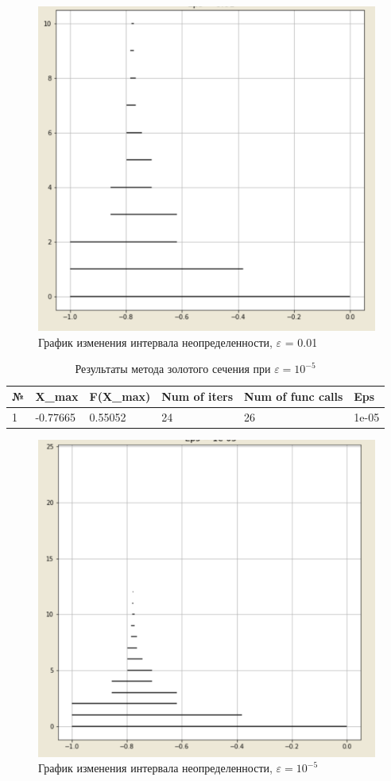 \documentclass[10pt]{article}
\begin{document}
\begin{enumerate}
\begin{figure}[H]
\centering
\includegraphics[width=0.8\linewidth]{4.png}
\caption{График изменения интервала неопределенности, $\varepsilon$ = 0.01}
\label{fig:image1}
\end{figure}
\newpage


\begin{table}[H]
\caption{Результаты метода золотого сечения при $\varepsilon = 10^{-5}$}
\begin{center}
\begin{tabular}{|l|l|l|l|l|l|}
\hline
№ & X\_max    & F(X\_max) & Num of iters & Num of func calls & Eps  \\
\hline
     1 & -0.77665 &   0.55052 &              24 &                   26 &
1e-05 \\
\hline
\end{tabular}
\end{center}
\end{table}

\begin{figure}[H]
\centering
\includegraphics[width=0.8\linewidth]{5.png}
\caption{График изменения интервала неопределенности, $\varepsilon = 10^{-5}$}
\label{fig:image1}
\end{figure}
\newpage


\end{enumerate}
\end{document}
